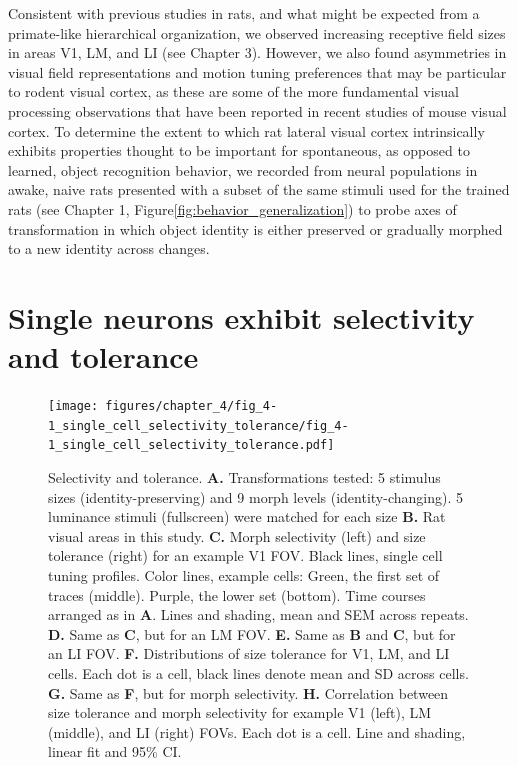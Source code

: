 Consistent with previous studies in rats, and what might be expected from a primate-like hierarchical organization, we observed increasing receptive field sizes in areas V1, LM, and LI (see Chapter 3). However, we also found asymmetries in visual field representations and motion tuning preferences that may be particular to rodent visual cortex, as these are some of the more fundamental visual processing observations that have been reported in recent studies of mouse visual cortex\cite{Liang2018, Sit2020, Murgas2020}. To determine the extent to which rat lateral visual cortex intrinsically exhibits properties thought to be important for spontaneous, as opposed to learned, object recognition behavior, we recorded from neural populations in awake, naive rats presented with a subset of the same stimuli used for the trained rats (see Chapter 1, Figure\ref{fig:behavior_generalization}) to probe axes of transformation in which object identity is either preserved or gradually morphed to a new identity across changes.

\section{Single neurons exhibit selectivity and tolerance}
\begin{figure}[t!]
    \texttt{[image: figures/chapter\_4/fig\_4-1\_single\_cell\_selectivity\_tolerance/fig\_4-1\_single\_cell\_selectivity\_tolerance.pdf]}
    \caption[Single neuron selectivity and tolerance]{Selectivity and tolerance. 
    \textbf{A.} Transformations tested: 5 stimulus sizes (identity-preserving) and 9 morph levels (identity-changing). 5 luminance stimuli (fullscreen) were matched for each size
    \textbf{B.} Rat visual areas in this study. 
    \textbf{C.} Morph selectivity (left) and size tolerance (right) for an example V1 FOV. Black lines, single cell tuning profiles. Color lines, example cells: Green, the first set of traces (middle). Purple, the lower set (bottom). Time courses arranged as in \textbf{A}. Lines and shading, mean and SEM across repeats.
    \textbf{D.} Same as \textbf{C}, but for an LM FOV.
    \textbf{E.} Same as \textbf{B} and \textbf{C}, but for an LI FOV.
    \textbf{F.} Distributions of size tolerance for V1, LM, and LI cells. Each dot is a cell, black lines denote mean and SD across cells.
    \textbf{G.} Same as \textbf{F}, but for morph selectivity. 
    \textbf{H.} Correlation between size tolerance and morph selectivity for example V1 (left), LM (middle), and LI (right) FOVs. Each dot is a cell. Line and shading, linear fit and 95\% CI.
    \label{fig:selectivity_tolerance}}
\end{figure}

